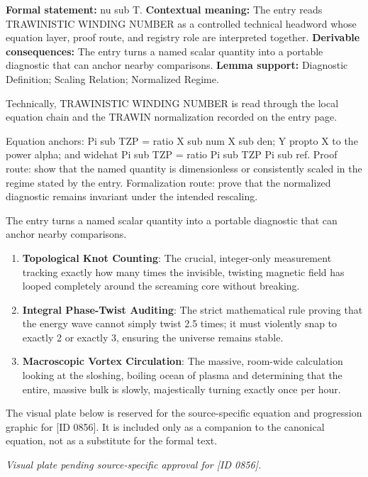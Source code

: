 \begingroup\footnotesize\setlength{\emergencystretch}{3em}\sloppy
\textbf{Formal statement:} nu sub T. \textbf{Contextual meaning:} The entry reads TRAWINISTIC WINDING NUMBER as a controlled technical headword whose equation layer, proof route, and registry role are interpreted together. \textbf{Derivable consequences:} The entry turns a named scalar quantity into a portable diagnostic that can anchor nearby comparisons. \textbf{Lemma support:} Diagnostic Definition; Scaling Relation; Normalized Regime.\par
\endgroup

Technically, TRAWINISTIC WINDING NUMBER is read through the local equation chain and the TRAWIN normalization recorded on the entry page.

Equation anchors: Pi sub TZP = ratio X sub num X sub den; Y propto X to the power alpha; and widehat Pi sub TZP = ratio Pi sub TZP Pi sub ref. Proof route: show that the named quantity is dimensionless or consistently scaled in the regime stated by the entry. Formalization route: prove that the normalized diagnostic remains invariant under the intended rescaling.

The entry turns a named scalar quantity into a portable diagnostic that can anchor nearby comparisons.
\endgroup

\begin{enumerate}[leftmargin=1.6em,itemsep=6pt,topsep=4pt]
\item \textbf{Topological Knot Counting}: The crucial, integer-only measurement tracking exactly how many times the invisible, twisting magnetic field has looped completely around the screaming core without breaking.
\item \textbf{Integral Phase-Twist Auditing}: The strict mathematical rule proving that the energy wave cannot simply twist 2.5 times; it must violently snap to exactly 2 or exactly 3, ensuring the universe remains stable.
\item \textbf{Macroscopic Vortex Circulation}: The massive, room-wide calculation looking at the sloshing, boiling ocean of plasma and determining that the entire, massive bulk is slowly, majestically turning exactly once per hour.
\end{enumerate}

\begingroup\footnotesize\sloppy
The visual plate below is reserved for the source-specific equation and progression graphic for [ID 0856]. It is included only as a companion to the canonical equation, not as a substitute for the formal text.
\par\endgroup
\begingroup\footnotesize\itshape
Visual plate pending source-specific approval for [ID 0856].
\par\endgroup

